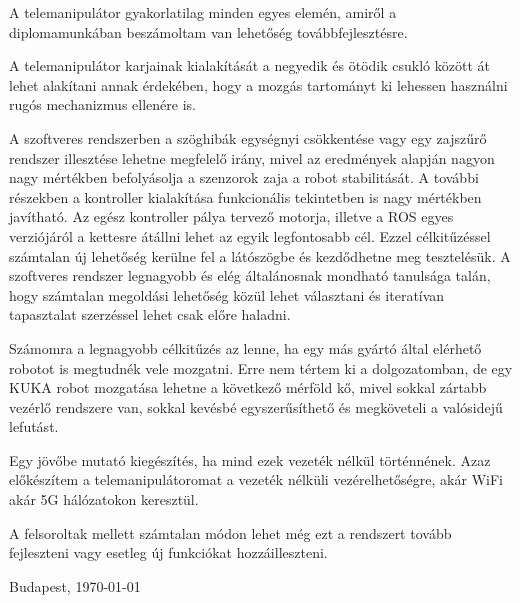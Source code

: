 A telemanipulátor gyakorlatilag minden egyes elemén, amiről a diplomamunkában beszámoltam van lehetőség továbbfejlesztésre.

A telemanipulátor karjainak kialakítását a negyedik és ötödik csukló között át lehet alakítani annak érdekében, hogy a mozgás tartományt ki lehessen használni rugós mechanizmus ellenére is.

A szoftveres rendszerben a szöghibák egységnyi csökkentése vagy egy zajszűrő rendszer illesztése lehetne megfelelő irány, mivel az eredmények alapján nagyon nagy mértékben befolyásolja a szenzorok zaja a robot stabilitását. A további részekben a kontroller kialakítása funkcionális tekintetben is nagy mértékben javítható. Az egész kontroller pálya tervező motorja, illetve a ROS egyes verziójáról a kettesre átállni lehet az egyik legfontosabb cél. Ezzel célkitűzéssel  számtalan új lehetőség kerülne fel a látószögbe és kezdődhetne meg tesztelésük. A szoftveres rendszer legnagyobb és elég általánosnak mondható tanulsága talán, hogy számtalan megoldási lehetőség közül lehet választani és iteratívan tapasztalat szerzéssel lehet csak előre haladni.

Számomra a legnagyobb célkitűzés az lenne, ha egy más gyártó által elérhető robotot is megtudnék vele mozgatni. Erre nem tértem ki a dolgozatomban, de egy KUKA robot mozgatása lehetne a következő mérföld kő, mivel sokkal zártabb vezérlő rendszere van, sokkal kevésbé egyszerűsíthető és megköveteli a valósidejű lefutást.

Egy jövőbe mutató kiegészítés, ha mind ezek vezeték nélkül történnének. Azaz előkészítem a telemanipulátoromat a vezeték nélküli vezérelhetőségre, akár WiFi akár 5G hálózatokon keresztül.

A felsoroltak mellett számtalan módon lehet még ezt a rendszert tovább fejleszteni vagy esetleg új funkciókat hozzáilleszteni.

\vspace{1cm}

\begin{flushleft}
{Budapest, \today}
\end{flushleft}

\begin{flushright}
\emph{\authorName}
\end{flushright}

\vfill
